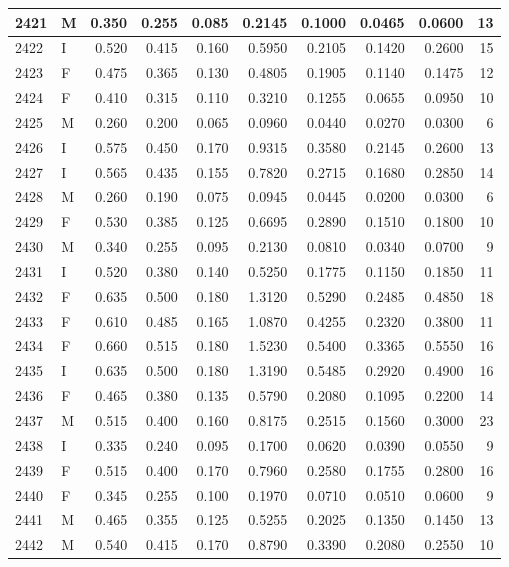 \documentclass[9pt,twocolumn,twoside,]{pnas-new}
\begin{document}
\begin{tabular}{l|l|r|r|r|r|r|r|r|r}
\hline
2421 & M & 0.350 & 0.255 & 0.085 & 0.2145 & 0.1000 & 0.0465 & 0.0600 & 13\\
\hline
2422 & I & 0.520 & 0.415 & 0.160 & 0.5950 & 0.2105 & 0.1420 & 0.2600 & 15\\
\hline
2423 & F & 0.475 & 0.365 & 0.130 & 0.4805 & 0.1905 & 0.1140 & 0.1475 & 12\\
\hline
2424 & F & 0.410 & 0.315 & 0.110 & 0.3210 & 0.1255 & 0.0655 & 0.0950 & 10\\
\hline
2425 & M & 0.260 & 0.200 & 0.065 & 0.0960 & 0.0440 & 0.0270 & 0.0300 & 6\\
\hline
2426 & I & 0.575 & 0.450 & 0.170 & 0.9315 & 0.3580 & 0.2145 & 0.2600 & 13\\
\hline
2427 & I & 0.565 & 0.435 & 0.155 & 0.7820 & 0.2715 & 0.1680 & 0.2850 & 14\\
\hline
2428 & M & 0.260 & 0.190 & 0.075 & 0.0945 & 0.0445 & 0.0200 & 0.0300 & 6\\
\hline
2429 & F & 0.530 & 0.385 & 0.125 & 0.6695 & 0.2890 & 0.1510 & 0.1800 & 10\\
\hline
2430 & M & 0.340 & 0.255 & 0.095 & 0.2130 & 0.0810 & 0.0340 & 0.0700 & 9\\
\hline
2431 & I & 0.520 & 0.380 & 0.140 & 0.5250 & 0.1775 & 0.1150 & 0.1850 & 11\\
\hline
2432 & F & 0.635 & 0.500 & 0.180 & 1.3120 & 0.5290 & 0.2485 & 0.4850 & 18\\
\hline
2433 & F & 0.610 & 0.485 & 0.165 & 1.0870 & 0.4255 & 0.2320 & 0.3800 & 11\\
\hline
2434 & F & 0.660 & 0.515 & 0.180 & 1.5230 & 0.5400 & 0.3365 & 0.5550 & 16\\
\hline
2435 & I & 0.635 & 0.500 & 0.180 & 1.3190 & 0.5485 & 0.2920 & 0.4900 & 16\\
\hline
2436 & F & 0.465 & 0.380 & 0.135 & 0.5790 & 0.2080 & 0.1095 & 0.2200 & 14\\
\hline
2437 & M & 0.515 & 0.400 & 0.160 & 0.8175 & 0.2515 & 0.1560 & 0.3000 & 23\\
\hline
2438 & I & 0.335 & 0.240 & 0.095 & 0.1700 & 0.0620 & 0.0390 & 0.0550 & 9\\
\hline
2439 & F & 0.515 & 0.400 & 0.170 & 0.7960 & 0.2580 & 0.1755 & 0.2800 & 16\\
\hline
2440 & F & 0.345 & 0.255 & 0.100 & 0.1970 & 0.0710 & 0.0510 & 0.0600 & 9\\
\hline
2441 & M & 0.465 & 0.355 & 0.125 & 0.5255 & 0.2025 & 0.1350 & 0.1450 & 13\\
\hline
2442 & M & 0.540 & 0.415 & 0.170 & 0.8790 & 0.3390 & 0.2080 & 0.2550 & 10\\

\end{tabular}
\end{document}
